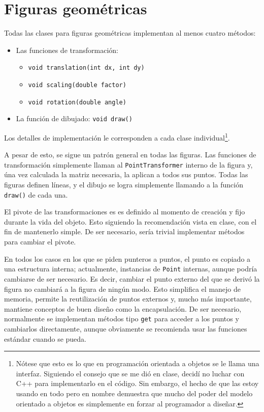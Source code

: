 \section{Figuras geométricas}
\label{figuras_geometricas}

Todas las clases para figuras geométricas implementan al menos cuatro métodos:
\begin{itemize}
	\item Las funciones de transformación:
	\begin{itemize}
		\item \lstinline!void translation(int dx, int dy)!
		\item \lstinline!void scaling(double factor)!
		\item \lstinline!void rotation(double angle)!
	\end{itemize}
	\item La función de dibujado: \lstinline!void draw()!
\end{itemize}

Los detalles de implementación le corresponden a cada clase individual\footnote{Nótese
que esto es lo que en programación orientada a objetos se le llama una interfaz. Siguiendo
el consejo que se me dió en clase, decidí no luchar con C++ para implementarlo en el
código. Sin embargo, el hecho de que las estoy usando en todo pero en nombre demuestra
que mucho del poder del modelo orientado a objetos es simplemente en forzar al programador
a diseñar.}.

A pesar de esto, se sigue un patrón general en todas las figuras. Las funciones de
transformación simplemente llaman al \lstinline!PointTransformer! interno de la figura
y, úna vez calculada la matriz necesaria, la aplican a todos sus puntos. Todas las
figuras definen líneas, y el dibujo se logra simplemente llamando a la función
\lstinline!draw()! de cada una.

El pivote de las transformaciones es es definido al momento de creación y
fijo durante la vida del objeto. Esto siguiendo la recomendación vista en clase,
con el fin de mantenerlo simple. De ser necesario, sería trivial implementar métodos
para cambiar el pivote.

En todos los casos en los que se piden punteros a puntos, el punto es copiado a
una estructura interna; actualmente, instancias de \lstinline!Point! internas, aunque
podría cambiarse de ser necesario. Es decir, cambiar el punto externo del que se derivó
la figura no cambiará a la figura de ningún modo. Esto simplifica el manejo de memoria,
permite la reutilización de puntos externos y, mucho más importante, mantiene conceptos
de buen diseño como la encapsulación. De ser necesario, normalmente se implementan
métodos tipo \lstinline!get! para acceder a los puntos y cambiarlos directamente,
aunque obviamente se recomienda usar las funciones estándar cuando se pueda.

